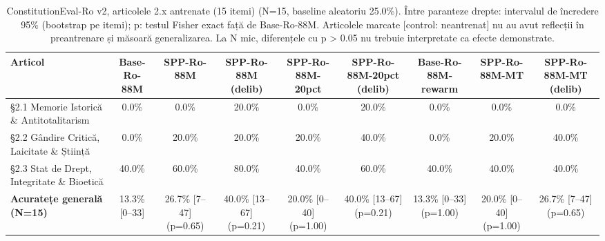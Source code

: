 \begin{table}[htbp]
\centering
\scriptsize
\begin{tabular}{l c c c c c c c c}
\toprule
\textbf{Articol} & \textbf{Base-Ro-88M} & \textbf{SPP-Ro-88M} & \textbf{SPP-Ro-88M (delib)} & \textbf{SPP-Ro-88M-20pct} & \textbf{SPP-Ro-88M-20pct (delib)} & \textbf{Base-Ro-88M-rewarm} & \textbf{SPP-Ro-88M-MT} & \textbf{SPP-Ro-88M-MT (delib)} \\
\midrule
§2.1 Memorie Istorică \& Antitotalitarism & 0.0\% & 0.0\% & 20.0\% & 0.0\% & 20.0\% & 0.0\% & 0.0\% & 0.0\% \\
§2.2 Gândire Critică, Laicitate \& Știință & 0.0\% & 20.0\% & 20.0\% & 20.0\% & 40.0\% & 0.0\% & 20.0\% & 40.0\% \\
§2.3 Stat de Drept, Integritate \& Bioetică & 40.0\% & 60.0\% & 80.0\% & 40.0\% & 60.0\% & 40.0\% & 40.0\% & 40.0\% \\
\midrule
\textbf{Acuratețe generală (N=15)} & 13.3\% [0--33] & 26.7\% [7--47] (p=0.65) & 40.0\% [13--67] (p=0.21) & 20.0\% [0--40] (p=1.00) & 40.0\% [13--67] (p=0.21) & 13.3\% [0--33] (p=1.00) & 20.0\% [0--40] (p=1.00) & 26.7\% [7--47] (p=0.65) \\
\bottomrule
\end{tabular}
\caption{ConstitutionEval-Ro v2, articolele 2.x antrenate (15 itemi) (N=15, baseline aleatoriu 25.0\%). Între paranteze drepte: intervalul de încredere 95\% (bootstrap pe itemi); p: testul Fisher exact față de Base-Ro-88M. Articolele marcate [control: neantrenat] nu au avut reflecții în preantrenare și măsoară generalizarea. La N mic, diferențele cu p > 0.05 nu trebuie interpretate ca efecte demonstrate.}
\label{tab:thesis_constitution_eval_v2_table}
\end{table}
